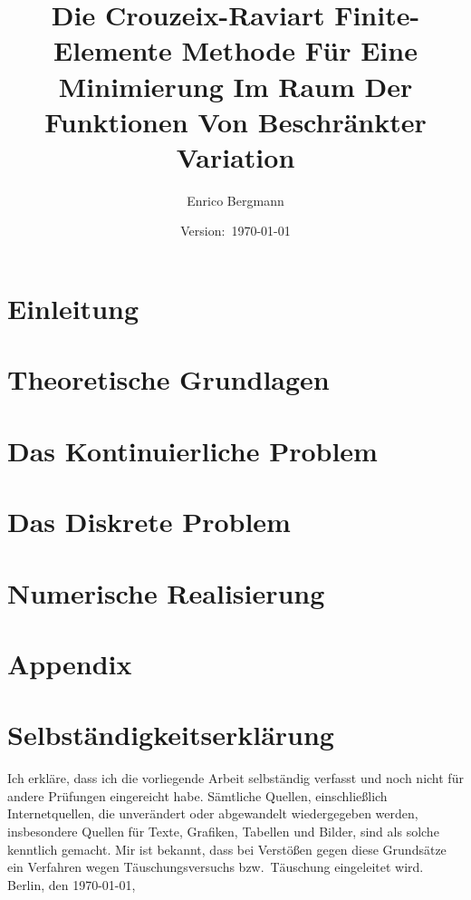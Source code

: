\documentclass[draft=false,twoside,12pt]{scrreprt}
\title{Die Crouzeix-Raviart Finite-Elemente Methode Für Eine Minimierung Im Raum
Der Funktionen Von Beschränkter Variation}
\author{Enrico Bergmann}
\date{Version:~\today}
\begin{document}
\hypersetup{pageanchor=false}
\maketitle
\tableofcontents
\hypersetup{pageanchor=true}

\chapter{Einleitung}


\chapter{Theoretische Grundlagen}


\chapter{Das Kontinuierliche Problem}


\chapter{Das Diskrete Problem}


\chapter{Numerische Realisierung}



\appendix
\chapter{Appendix}



\chapter*{Selbständigkeitserklärung}
Ich erkläre, dass ich die vorliegende Arbeit selbständig verfasst und noch nicht 
für andere Prüfungen eingereicht habe. Sämtliche Quellen, einschließlich
Internetquellen, die unverändert oder abgewandelt wiedergegeben werden,
insbesondere Quellen für Texte, Grafiken, Tabellen und Bilder, sind als solche
kenntlich gemacht. Mir ist bekannt, dass bei Verstößen gegen diese Grundsätze ein
Verfahren wegen Täuschungsversuchs bzw.\ Täuschung eingeleitet wird. 
\bigbreak
\noindent Berlin, den \today, 
\end{document}
